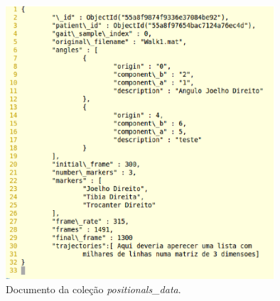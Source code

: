 \begin{figure}[H]
	\centering
	\includegraphics[width=10cm]{figuras/listagem3.eps}
	\caption{Documento da coleção \emph{positionals\_data}.}
	\label{listagem3}
\end{figure}


